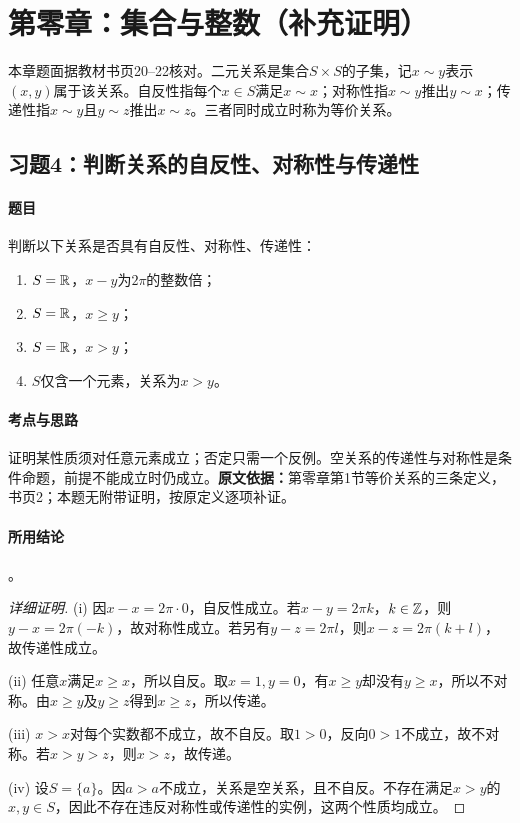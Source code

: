 \section{第零章：集合与整数（补充证明）}
本章题面据教材书页20--22核对。二元关系是集合$S\times S$的子集，记$x\sim y$表示$(x,y)$属于该关系。自反性指每个$x\in S$满足$x\sim x$；对称性指$x\sim y$推出$y\sim x$；传递性指$x\sim y$且$y\sim z$推出$x\sim z$。三者同时成立时称为等价关系。

\subsection{习题4：判断关系的自反性、对称性与传递性}\label{exercise:0:4}
\paragraph{题目}判断以下关系是否具有自反性、对称性、传递性：
\begin{enumerate}[label=(\roman*)]
\item $S=\mathbb R$，$x-y$为$2\pi$的整数倍；
\item $S=\mathbb R$，$x\geq y$；
\item $S=\mathbb R$，$x>y$；
\item $S$仅含一个元素，关系为$x>y$。
\end{enumerate}
\paragraph{考点与思路}证明某性质须对任意元素成立；否定只需一个反例。空关系的传递性与对称性是条件命题，前提不能成立时仍成立。\textbf{原文依据：}第零章第1节等价关系的三条定义，书页2；本题无附带证明，按原定义逐项补证。
\paragraph{所用结论}。
\begin{proof}[详细证明]
(i) 因$x-x=2\pi\cdot0$，自反性成立。若$x-y=2\pi k$，$k\in\mathbb Z$，则$y-x=2\pi(-k)$，故对称性成立。若另有$y-z=2\pi l$，则$x-z=2\pi(k+l)$，故传递性成立。

(ii) 任意$x$满足$x\geq x$，所以自反。取$x=1,y=0$，有$x\geq y$却没有$y\geq x$，所以不对称。由$x\geq y$及$y\geq z$得到$x\geq z$，所以传递。

(iii) $x>x$对每个实数都不成立，故不自反。取$1>0$，反向$0>1$不成立，故不对称。若$x>y>z$，则$x>z$，故传递。

(iv) 设$S=\{a\}$。因$a>a$不成立，关系是空关系，且不自反。不存在满足$x>y$的$x,y\in S$，因此不存在违反对称性或传递性的实例，这两个性质均成立。
\end{proof}
